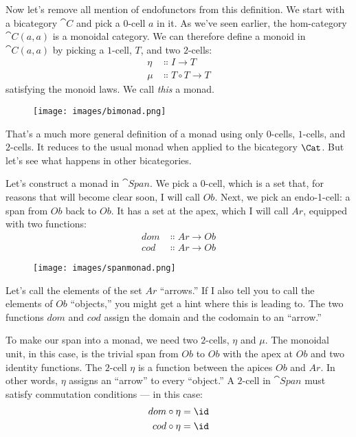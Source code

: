 Now let's remove all mention of endofunctors from this definition. We
start with a bicategory $\cat{C}$ and pick a $0$-cell $a$ in it.
As we've seen earlier, the hom-category $\cat{C}(a, a)$ is a monoidal
category. We can therefore define a monoid in $\cat{C}(a, a)$ by
picking a $1$-cell, $T$, and two $2$-cells:
\begin{align*}
\eta &\Colon I \to T \\
\mu &\Colon T \circ T \to T
\end{align*}
satisfying the monoid laws. We call \emph{this} a monad.

\begin{figure}[H]
\centering
\texttt{[image: images/bimonad.png]}
\end{figure}

\noindent
That's a much more general definition of a monad using only $0$-cells,
$1$-cells, and $2$-cells. It reduces to the usual monad when applied to the
bicategory $\Cat$. But let's see what happens in other
bicategories.

Let's construct a monad in $\cat{Span}$. We pick a $0$-cell, which is a
set that, for reasons that will become clear soon, I will call
$Ob$. Next, we pick an endo-1-cell: a span from $Ob$ back
to $Ob$. It has a set at the apex, which I will call $Ar$,
equipped with two functions:
\begin{align*}
dom &\Colon Ar \to Ob \\
cod &\Colon Ar \to Ob
\end{align*}

\begin{figure}[H]
\centering
\texttt{[image: images/spanmonad.png]}
\end{figure}

\noindent
Let's call the elements of the set $Ar$ ``arrows.'' If I also
tell you to call the elements of $Ob$ ``objects,'' you might get
a hint where this is leading to. The two functions $dom$ and
$cod$ assign the domain and the codomain to an ``arrow.''

To make our span into a monad, we need two $2$-cells, $\eta$ and
$\mu$. The monoidal unit, in this case, is the trivial span from
$Ob$ to $Ob$ with the apex at $Ob$ and two identity
functions. The $2$-cell $\eta$ is a function between the apices
$Ob$ and $Ar$. In other words, $\eta$ assigns an
``arrow'' to every ``object.'' A $2$-cell in $\cat{Span}$ must satisfy
commutation conditions --- in this case:
\begin{align*}
dom &\circ \eta = \id \\
cod &\circ \eta = \id
\end{align*}

